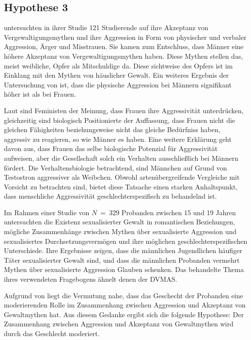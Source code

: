 \subsection{Hypothese 3}    \label{subsec_2.2.3}
\textcite{H2_u_3_Bhogal_2016} untersuchten in ihrer Studie 121 Studierende auf ihre Akzeptanz von Vergewaltigungsmythen und ihre Aggression in Form von physischer und verbaler Aggression, Ärger und Misstrauen. Sie kamen zum Entschluss, dass Männer eine höhere Akzeptanz von Vergewaltigungsmythen haben. Diese Mythen stellen das, meist weibliche, Opfer als Mitschuldige da. Diese sichtweise des Opfers ist im Einklang mit den Mythen von häuslicher Gewalt. Ein weiteres Ergebnis der Untersuchung von \textcite{H2_u_3_Bhogal_2016} ist, dass die physische Aggression bei Männern signifikant höher ist als bei Frauen.

Laut \textcite{H3_MFUnterschied} sind Feministen der Meinung, dass Frauen ihre Aggressivität unterdrücken, gleichzeitig sind biologisch Positionierte der Auffassung, dass Frauen nicht die gleichen Fähigkeiten beziehungsweise nicht das gleiche Bedürfniss haben, aggressiv zu reagieren, so wie Männer es haben. Eine weitere Erklärung geht davon aus, dass Frauen das selbe biologische Potenzial für Aggressivität aufweisen, aber die Gesellschaft solch ein Verhalten ausschließlich bei Männern fördert. Die Verhaltensbiologie betrachtend, sind Männchen auf Grund von Testostron aggressiver als Weibchen. Obwohl artenübergreifende Vergleiche mit Vorsicht zu betrachten sind, bietet diese Tatsache einen starken Anhaltspunkt, dass menschliche Aggressivität geschlechterspezifisch zu behandelnd ist.

Im Rahmen einer Studie von $N$~=~329 Probanden zwischen 15 und 19 Jahren untersuchten \textcite{H3_2020} die Existenz sexualisierter Gewalt in romantischen Beziehungen, mögliche Zusammenhänge zwischen Mythen über sexualisierte Aggression und sexualisiertes Durchsetzungsvermögen und ihre möglichen geschlechterspezifischen Unterschiede. Ihre Ergebnisse zeigen, dass die männlichen Jugendlichen häufiger Täter sexualisierter Gewalt sind, und dass die männlichen Probanden vermehrt Mythen über sexualisierte Aggression Glauben schenken. Das behandelte Thema ihres verwendeten Fragebogens ähnelt denen der DVMAS.

Aufgrund von \textcite{H2_u_3_Bhogal_2016, H3_MFUnterschied, H3_2020} liegt die Vermutung nahe, dass das Geschecht der Probanden eine moderierenden Rolle im Zusammenhang zwischen Aggression und Akzeptanz von Gewaltmythen hat. Aus diesem Gedanke ergibt sich die folgende Hypothese: Der Zusammenhang zwischen Aggression und Akzeptanz von Gewaltmythen wird durch das Geschlecht moderiert.


